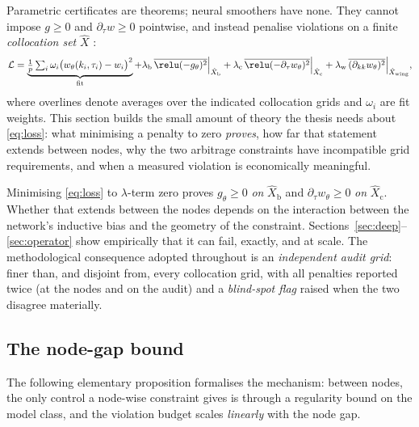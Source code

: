 Parametric certificates are theorems; neural smoothers have none. They cannot impose
$g\ge0$ and $\partial_\tau w\ge0$ pointwise, and instead penalise violations on a finite
\emph{collocation set} $\hat X$ \cite{ackerer2020,hoshisashi2023}:
\begin{equation}\label{eq:loss}
\mathcal L=\underbrace{\tfrac1p\textstyle\sum_i\omega_i\bigl(w_\theta(k_i,\tau_i)-w_i\bigr)^2}_{\text{fit}}
+\lambda_{\mathrm b}\,\overline{\relu(-g_\theta)^2}\Big|_{\hat X_{\mathrm b}}
+\lambda_{\mathrm c}\,\overline{\relu(-\partial_\tau w_\theta)^2}\Big|_{\hat X_{\mathrm c}}
+\lambda_{\mathrm w}\,\overline{(\partial_{kk}w_\theta)^2}\Big|_{\hat X_{\mathrm{wing}}},
\end{equation}
where overlines denote averages over the indicated collocation grids and $\omega_i$ are fit
weights. This section builds the small amount of theory the thesis needs about
\eqref{eq:loss}: what minimising a penalty to zero \emph{proves}, how far that statement
extends between nodes, why the two arbitrage constraints have incompatible grid requirements,
and when a measured violation is economically meaningful.

\begin{remark}\label{rem:sampling}
Minimising \eqref{eq:loss} to $\lambda$-term zero proves $g_\theta\ge0$ \emph{on}
$\hat X_{\mathrm b}$ and $\partial_\tau w_\theta\ge0$ \emph{on} $\hat X_{\mathrm c}$. Whether that extends between the nodes depends on the interaction between the
network's inductive bias and the geometry of the constraint.
Sections~\ref{sec:deep}--\ref{sec:operator} show empirically that it can fail, exactly, and at
scale. The methodological consequence adopted throughout is an \emph{independent audit grid}:
finer than, and disjoint from, every collocation grid, with all penalties reported twice (at
the nodes and on the audit) and a \emph{blind-spot flag} raised when the two disagree
materially.
\end{remark}

\subsection{The node-gap bound}

The following elementary proposition formalises the mechanism: between nodes, the only control
a node-wise constraint gives is through a regularity bound on the model class, and the
violation budget scales \emph{linearly} with the node gap.

